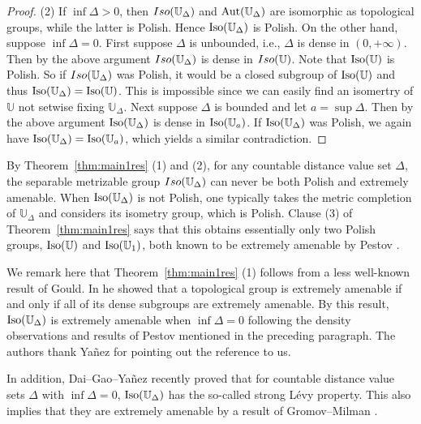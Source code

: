 \documentclass{amsart}
\theoremstyle{definition}
\theoremstyle{remark}
\begin{document}
\begin{proof}
(2) If $\inf\Delta>0$, then ${\rm Iso}(\mathbb{U}_\Delta)$ and $\mbox{\rm Aut}(\mathbb{U}_\Delta)$ are isomorphic as topological groups, while the latter is Polish. Hence $\mbox{\rm Iso}(\mathbb{U}_\Delta)$ is Polish. On the other hand, suppose $\inf\Delta=0$. First suppose $\Delta$ is unbounded, i.e., $\Delta$ is dense in $(0,+\infty)$. Then by the above argument ${\rm Iso}(\mathbb{U}_\Delta)$ is dense in ${\rm Iso}(\mathbb{U})$. Note that $\mbox{\rm Iso}(\mathbb{U})$ is Polish. So if ${\rm Iso}(\mathbb{U}_\Delta)$ was Polish, it would be a closed subgroup of $\mbox{\rm Iso}(\mathbb{U})$ and thus $\mbox{\rm Iso}(\mathbb{U}_\Delta)=\mbox{\rm Iso}(\mathbb{U})$. This is impossible since we can easily find an isomertry of $\mathbb{U}$ not setwise fixing $\mathbb{U}_\Delta$.  Next suppose $\Delta$ is bounded and let $a=\sup\Delta$. Then by the above argument $\mbox{\rm Iso}(\mathbb{U}_\Delta)$ is dense in $\mbox{\rm Iso}(\mathbb{U}_a)$. If $\mbox{\rm Iso}(\mathbb{U}_\Delta)$ was Polish, we again have  $\mbox{\rm Iso}(\mathbb{U}_\Delta)=\mbox{\rm Iso}(\mathbb{U}_a)$, which yields a similar contradiction.
\end{proof}


By Theorem~\ref{thm:main1res} (1) and (2), for any countable distance value set $\Delta$, the separable metrizable group ${\rm Iso}(\mathbb{U}_\Delta)$ can never be both Polish and extremely amenable. When $\mbox{\rm Iso}(\mathbb{U}_\Delta)$ is not Polish, one typically takes the metric completion of $\mathbb{U}_\Delta$ and considers its isometry group, which is Polish. Clause (3) of Theorem~\ref{thm:main1res} says that this obtains essentially only two Polish groups, $\mbox{\rm Iso}(\mathbb{U})$ and $\mbox{\rm Iso}(\mathbb{U}_1)$, both known to be extremely amenable by Pestov \cite{Pestov02}.

We remark here that Theorem~\ref{thm:main1res} (1) follows from a less well-known result of Gould. In \cite[Theorem A.2.2 (4)]{Gould} he showed that a topological group is extremely amenable if and only if all of its dense subgroups are extremely amenable. By this result, $\mbox{\rm Iso}(\mathbb{U}_\Delta)$ is extremely amenable when $\inf \Delta=0$ following the density observations and results of Pestov mentioned in the preceding paragraph. The authors thank Ya\~{n}ez for pointing out the reference \cite{Gould} to us.

In addition, Dai--Gao--Ya\~{n}ez \cite{DGY} recently proved that for countable distance value sets $\Delta$ with $\inf\Delta=0$, $\mbox{\rm Iso}(\mathbb{U}_\Delta)$ has the so-called strong L\'{e}vy property. This also implies that they are extremely amenable by a result of Gromov--Milman \cite{GM}.
\end{document}
